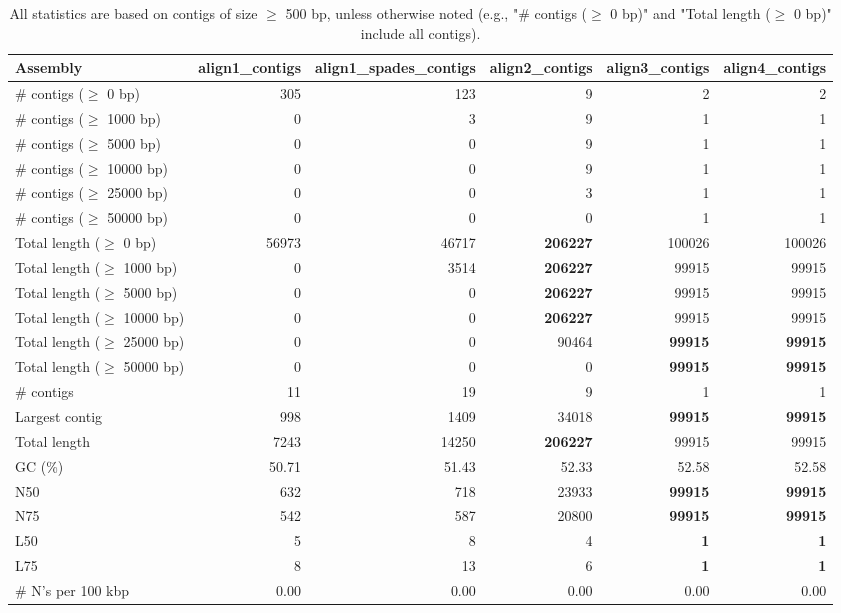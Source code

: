 \documentclass[12pt,a4paper]{article}
\begin{document}
\begin{table}[ht]
\begin{center}
\caption{All statistics are based on contigs of size $\geq$ 500 bp, unless otherwise noted (e.g., "\# contigs ($\geq$ 0 bp)" and "Total length ($\geq$ 0 bp)" include all contigs).}
\begin{tabular}{|l*{5}{|r}|}
\hline
Assembly & align1\_contigs & align1\_spades\_contigs & align2\_contigs & align3\_contigs & align4\_contigs \\ \hline
\# contigs ($\geq$ 0 bp) & 305 & 123 & 9 & 2 & 2 \\ \hline
\# contigs ($\geq$ 1000 bp) & 0 & 3 & 9 & 1 & 1 \\ \hline
\# contigs ($\geq$ 5000 bp) & 0 & 0 & 9 & 1 & 1 \\ \hline
\# contigs ($\geq$ 10000 bp) & 0 & 0 & 9 & 1 & 1 \\ \hline
\# contigs ($\geq$ 25000 bp) & 0 & 0 & 3 & 1 & 1 \\ \hline
\# contigs ($\geq$ 50000 bp) & 0 & 0 & 0 & 1 & 1 \\ \hline
Total length ($\geq$ 0 bp) & 56973 & 46717 & {\bf 206227} & 100026 & 100026 \\ \hline
Total length ($\geq$ 1000 bp) & 0 & 3514 & {\bf 206227} & 99915 & 99915 \\ \hline
Total length ($\geq$ 5000 bp) & 0 & 0 & {\bf 206227} & 99915 & 99915 \\ \hline
Total length ($\geq$ 10000 bp) & 0 & 0 & {\bf 206227} & 99915 & 99915 \\ \hline
Total length ($\geq$ 25000 bp) & 0 & 0 & 90464 & {\bf 99915} & {\bf 99915} \\ \hline
Total length ($\geq$ 50000 bp) & 0 & 0 & 0 & {\bf 99915} & {\bf 99915} \\ \hline
\# contigs & 11 & 19 & 9 & 1 & 1 \\ \hline
Largest contig & 998 & 1409 & 34018 & {\bf 99915} & {\bf 99915} \\ \hline
Total length & 7243 & 14250 & {\bf 206227} & 99915 & 99915 \\ \hline
GC (\%) & 50.71 & 51.43 & 52.33 & 52.58 & 52.58 \\ \hline
N50 & 632 & 718 & 23933 & {\bf 99915} & {\bf 99915} \\ \hline
N75 & 542 & 587 & 20800 & {\bf 99915} & {\bf 99915} \\ \hline
L50 & 5 & 8 & 4 & {\bf 1} & {\bf 1} \\ \hline
L75 & 8 & 13 & 6 & {\bf 1} & {\bf 1} \\ \hline
\# N's per 100 kbp & 0.00 & 0.00 & 0.00 & 0.00 & 0.00 \\ \hline
\end{tabular}
\end{center}
\end{table}
\end{document}
